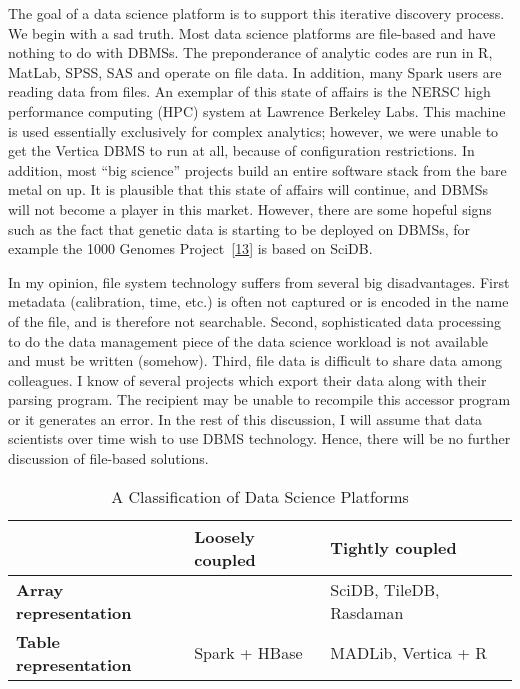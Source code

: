 \documentclass[b5paper,11pt,twoside,openright]{book}
\begin{document}
The goal of a data science platform is to support this iterative
discovery process. We begin with a sad truth. Most data science
platforms are file-based and have nothing to do with DBMSs. The
preponderance of analytic codes are run in R, MatLab, SPSS, SAS and
operate on file data. In addition, many Spark users are reading data
from files. An exemplar of this state of affairs is the NERSC high
performance computing (HPC) system at Lawrence Berkeley Labs. This
machine is used essentially exclusively for complex analytics; however,
we were unable to get the Vertica DBMS to run at all, because of
configuration restrictions. In addition, most ``big science'' projects
build an entire software stack from the bare metal on up. It is
plausible that this state of affairs will continue, and DBMSs will not
become a player in this market. However, there are some hopeful signs
such as the fact that genetic data is starting to be deployed on DBMSs,
for example the 1000 Genomes
Project~{{[}\protect\hyperlink{ref-1000-genomes}{13}{]}} is based on
SciDB.

In my opinion, file system technology suffers from several big
disadvantages. First metadata (calibration, time, etc.) is often not
captured or is encoded in the name of the file, and is therefore not
searchable. Second, sophisticated data processing to do the data
management piece of the data science workload is not available and must
be written (somehow). Third, file data is difficult to share data among
colleagues. I know of several projects which export their data along
with their parsing program. The recipient may be unable to recompile
this accessor program or it generates an error. In the rest of this
discussion, I will assume that data scientists over time wish to use
DBMS technology. Hence, there will be no further discussion of
file-based solutions.

\begin{table}
\footnotesize
\centering
\begin{tabu}{lll}
  \toprule
  & \textbf{Loosely coupled} & \textbf{Tightly coupled}\\\midrule
  \textbf{Array representation} & & SciDB, TileDB, Rasdaman\\
  \textbf{Table representation} & Spark + HBase & MADLib, Vertica +
  R\\
  \bottomrule
\end{tabu}

\caption{A Classification of Data Science Platforms\label{table:data-science-platforms}}
\end{table}
\end{document}

